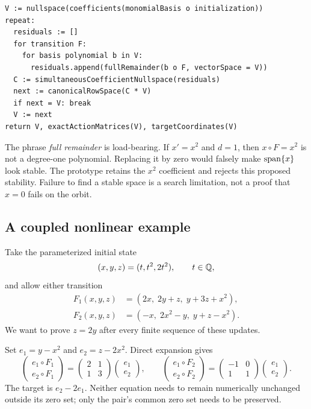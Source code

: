 \begin{lstlisting}
V := nullspace(coefficients(monomialBasis o initialization))
repeat:
  residuals := []
  for transition F:
    for basis polynomial b in V:
      residuals.append(fullRemainder(b o F, vectorSpace = V))
  C := simultaneousCoefficientNullspace(residuals)
  next := canonicalRowSpace(C * V)
  if next = V: break
  V := next
return V, exactActionMatrices(V), targetCoordinates(V)
\end{lstlisting}

The phrase \emph{full remainder} is load-bearing. If $x'=x^2$ and $d=1$,
then $x\circ F=x^2$ is not a degree-one polynomial. Replacing it by zero would
falsely make $\operatorname{span}\{x\}$ look stable. The prototype retains the $x^2$
coefficient and rejects this proposed stability. Failure to find a stable
space is a search limitation, not a proof that $x=0$ fails on the orbit.

\subsection{A coupled nonlinear example}

Take the parameterized initial state
\[
 (x,y,z)=(t,t^2,2t^2),\qquad t\in\mathbb{Q},
\]
and allow either transition
\begin{align*}
 F_1(x,y,z)&=(2x,\;2y+z,\;y+3z+x^2),\\
 F_2(x,y,z)&=(-x,\;2x^2-y,\;y+z-x^2).
\end{align*}
We want to prove $z=2y$ after every finite sequence of these updates.

Set $e_1=y-x^2$ and $e_2=z-2x^2$. Direct expansion gives
\[
 \begin{pmatrix}e_1\circ F_1\\e_2\circ F_1\end{pmatrix}
 =\begin{pmatrix}2&1\\1&3\end{pmatrix}
 \begin{pmatrix}e_1\\e_2\end{pmatrix},\qquad
 \begin{pmatrix}e_1\circ F_2\\e_2\circ F_2\end{pmatrix}
 =\begin{pmatrix}-1&0\\1&1\end{pmatrix}
 \begin{pmatrix}e_1\\e_2\end{pmatrix}.
\]
The target is $e_2-2e_1$. Neither equation needs to remain numerically unchanged
outside its zero set; only the pair's common zero set needs to be preserved.

